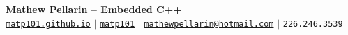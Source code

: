 \begin{center}
    \textbf{\Huge Mathew Pellarin -- Embedded C++} \\ \vspace{5pt}
    \hspace{1pt} \faGlobe \hspace{2pt} \href{https://matp101.github.io/}{\texttt{matp101.github.io}} \hspace{1pt} $|$
    \hspace{1pt} \faGithub \hspace{2pt} \href{https://github.com/matp101}{\texttt{matp101}} \hspace{1pt} $|$
    \hspace{1pt} \faEnvelope \hspace{2pt} \href{mailto::mathewpellarin@hotmail.com}{\texttt{mathewpellarin@hotmail.com}} \hspace{1pt} $|$
    \small \faPhone* \texttt{226.246.3539}
    \\ \vspace{-3pt}
  \end{center}